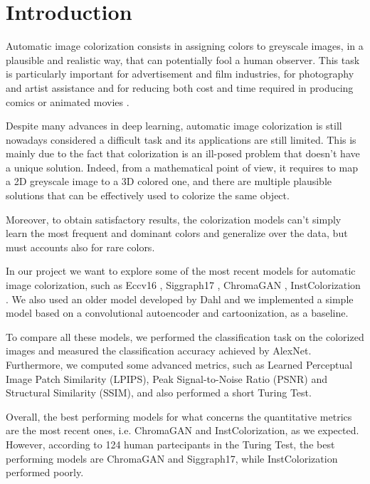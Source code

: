 \section{Introduction}
Automatic image colorization consists in assigning colors to greyscale images, in a plausible and
realistic way, that can potentially fool a human observer. This task is particularly important for advertisement
and film industries, for photography and artist assistance \cite{chromagan} and for reducing both cost and time required in producing comics or animated movies \cite{animation}.

Despite many advances in deep learning, automatic image colorization is still nowadays considered a difficult task
and its applications are still limited. This is mainly due to the fact that colorization is an ill-posed
problem that doesn't have a unique solution. Indeed, from a mathematical point of view,
it requires to map a 2D greyscale image to a 3D colored one, and there are multiple plausible solutions that can
be effectively used to colorize the same object.

Moreover, to obtain satisfactory results, the colorization models can't simply learn the most frequent and dominant colors and generalize over the data, but must accounts also for rare colors.

In our project we want to explore some of the most recent models for automatic image colorization, such as
Eccv16 \cite{zhang}, Siggraph17 \cite{siggraph}, ChromaGAN \cite{chromagan}, InstColorization \cite{su}.
We also used an older model developed by Dahl \cite{dahl} and we implemented a simple model based on a
convolutional autoencoder and cartoonization, as a baseline.

To compare all these models, we performed the classification task on the colorized images and measured the
classification accuracy achieved by AlexNet. Furthermore, we computed some advanced metrics, such as Learned Perceptual Image Patch
Similarity (LPIPS), Peak Signal-to-Noise Ratio (PSNR) and Structural Similarity (SSIM), and also performed a short
Turing Test.

Overall, the best performing models for what concerns the quantitative metrics are the most recent ones,
i.e. ChromaGAN and InstColorization, as we expected. However, according to 124 human partecipants in the Turing Test, the best performing models
are ChromaGAN and Siggraph17, while InstColorization performed poorly.



